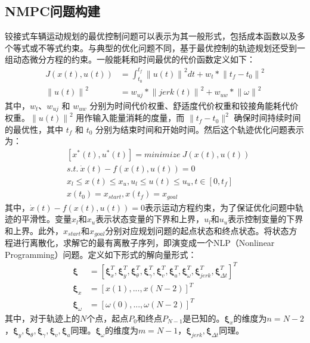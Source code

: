 \documentclass[master,academic]{ysuthesis} %
\begin{document}
		\subsection{NMPC问题构建}
		铰接式车辆运动规划的最优控制问题可以表示为其一般形式，包括成本函数以及多个等式或不等式约束。与典型的优化问题不同，基于最优控制的轨迹规划还受到一组动态微分方程的约束。一般能耗和时间最优的代价函数定义如下：
		\begin{equation}
			\begin{aligned}
				J(x(t),u(t)) &= \int_{t_0}^{t_f}
				\left\| u(t)\right\|^2dt +w_t*\left\|t_f-t_0\right\|^2    \\
				\left\|u(t)\right\|^2&=w_{uj}*\left\|jerk(t)\right\|^2+w_{uw}*\left\|\omega\right\|^2
			\end{aligned} 
		\end{equation}
		其中，$w_t$、$w_{uj}$ 和 $w_{uw}$ 分别为时间代价权重、舒适度代价权重和铰接角能耗代价权重。$\left\|u(t)\right\|^2$ 用作输入能量消耗的度量，而 $\|t_f- t_0\|^2$ 确保时间持续时间的最优性，其中 $t_f$ 和 $t_0$ 分别为结束时间和开始时间。然后这个轨迹优化问题表示为：
		\begin{equation}
			\begin{aligned}
				&\left[x^*(t),u^*(t)\right] = minimize\ J(x(t),u(t))\\      
				&s.t.\ \dot x(t)-f(x(t),u(t))=0\\
				&x_l \leq x(t) \leq x_u, u_l \leq u(t) \leq u_u,t\in \left[0,t_f\right]\\
				&x(t_0)=x_{start},x(t_f)=x_{goal}\label{eq:最优控制优化问题}
			\end{aligned}   
		\end{equation}
		其中，$\dot x(t)-f(x(t),u(t))=0$表示运动方程约束，为了保证优化问题中轨迹的平滑性。变量$x_l$和$x_u$表示状态变量的下界和上界，$u_l$和$u_u$表示控制变量的下界和上界。此外，$x_{start}$和$x_{goal}$分别对应规划问题的起点状态和终点状态。将状态方程进行离散化，求解它的最有离散子序列，即演变成一个NLP（Nonlinear Programming）问题。定义如下形式的解向量形式：
		\begin{equation}
			\begin{aligned}
				\bm{\xi} &=\left[ \bm{\xi} _{x}^{T},\bm{\xi} _{y}^{T},\bm{\xi} _{\theta}^{T},\bm{\xi} _{\gamma}^{T},\bm{\xi} _{v}^{T},\bm{\xi} _{a}^{T},\bm{\xi} _{\omega}^{T},\bm{\xi}_{{jerk}}^{T},\bm{\xi} _{\Delta t}^{T} \right] ^T\\
				\bm{\xi} _x&=\left[ x\left( 1 \right) ,...,x\left( N-2 \right) \right] ^T\\
				\bm{\xi} _{\omega}&=\left[ \omega \left( 0 \right) ,...,\omega \left( N-2 \right) \right] ^T
			\end{aligned}   
		\end{equation}
		其中，对于轨迹上的$N$个点，起点$P_0$和终点$P_{N-1}$是已知的。$\bm{\xi} _{x}$的维度为$n=N-2$，$\bm{\xi} _{y},\bm{\xi} _{\theta},\bm{\xi} _{\gamma},\bm{\xi} _{v},\bm{\xi} _{a}$同理。$\bm{\xi} _{\omega}$的维度为$m=N-1$，$\bm{\xi}_{jerk},\bm{\xi} _{\Delta t}$同理。
\end{document}
